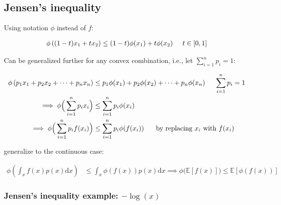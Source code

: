 \documentclass{article}
\def\E{\mathbb{E}}
\def\d{\text{d}}
\def\E{{\mathbb{E}}}
\begin{document}

\subsection{Jensen’s inequality}


Using notation $\phi$ instead of $f$:

\begin{equation}\begin{split}
\phi \left( (1-t) x_1 + t x_2 \right) \leq (1-t) \phi (x_1) + t  \phi(x_2)  \hspace{5 mm} t \in [0, 1]
\end{split}\end{equation}

Can be generalized further for any convex combination, i.e., let $\sum_{i=1}^n p_i = 1$:

\begin{equation}\begin{split}
\phi \left( p_1 x_1 + p_2 x_2 + \dots + p_n x_n \right) &\leq p_1 \phi (x_1) + p_2  \phi(x_2) + \dots + p_n \phi (x_n)  \hspace{5 mm} \sum_{i=1}^n p_i = 1\\
\implies \phi \Big( \sum_{i=1}^n p_i x_i \Big) &\leq \sum_{i=1}^n p_i \phi (x_i) \\
\implies \phi \Big( \sum_{i=1}^n p_i f(x_i) \Big) &\leq \sum_{i=1}^n p_i \phi (f(x_i)) \hspace{5 mm} \text{ by replacing } x_i \text{ with } f(x_i)
\end{split}\end{equation}

generalize to the continuous case:

\begin{equation}\begin{split}
\phi \left( \int_{x } f(x) p(x) \d x \right) &\leq \int_{x }  \phi (f(x)) p(x) \d x \implies \phi \big( \E[  f(x) ] \big) \le \E [\phi (f(x))]
\end{split}\end{equation}





\subsubsection{Jensen’s inequality example: $-\log(x)$}
\end{document}
